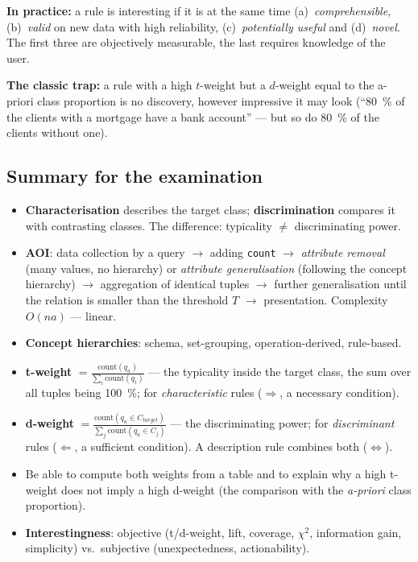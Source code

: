 \documentclass[11pt,a4paper]{article}
\theoremstyle{definition}
\providecommand{\uv}[1]{``#1''}
\begin{document}
\textbf{In practice:} a rule is interesting if it is at the same time (a)~\emph{comprehensible},
(b)~\emph{valid} on new data with high reliability, (c)~\emph{potentially useful} and
(d)~\emph{novel}. The first three are objectively measurable, the last requires knowledge of the
user.

\textbf{The classic trap:} a rule with a high $t$-weight but a $d$-weight equal to the a-priori
class proportion is no discovery, however impressive it may look (\uv{80~\% of the clients with a
mortgage have a bank account} --- but so do 80~\% of the clients without one).

\subsection{Summary for the examination}

\begin{itemize}
\item \textbf{Characterisation} describes the target class; \textbf{discrimination} compares it
      with contrasting classes. The difference: typicality $\neq$ discriminating power.
\item \textbf{AOI}: data collection by a query $\to$ adding \texttt{count} $\to$ \emph{attribute
      removal} (many values, no hierarchy) or \emph{attribute generalisation} (following the
      concept hierarchy) $\to$ aggregation of identical tuples $\to$ further generalisation until
      the relation is smaller than the threshold $T$ $\to$ presentation. Complexity $O(na)$ ---
      linear.
\item \textbf{Concept hierarchies}: schema, set-grouping, operation-derived, rule-based.
\item \textbf{t-weight} $=\frac{\mathrm{count}(q_a)}{\sum_i\mathrm{count}(q_i)}$ --- the typicality
      inside the target class, the sum over all tuples being 100~\%; for \emph{characteristic}
      rules ($\Rightarrow$, a necessary condition).
\item \textbf{d-weight} $=\frac{\mathrm{count}(q_a\in C_{target})}{\sum_j\mathrm{count}
      (q_a\in C_j)}$ --- the discriminating power; for \emph{discriminant} rules ($\Leftarrow$, a
      sufficient condition). A description rule combines both ($\Leftrightarrow$).
\item Be able to compute both weights from a table and to explain why a high t-weight does not imply
      a high d-weight (the comparison with the \emph{a-priori} class proportion).
\item \textbf{Interestingness}: objective (t/d-weight, lift, coverage, $\chi^2$, information gain,
      simplicity) vs.\ subjective (unexpectedness, actionability).
\end{itemize}
\end{document}
